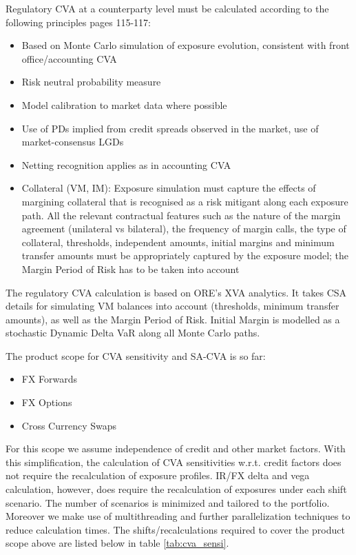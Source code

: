 \medskip\noindent
Regulatory CVA at a counterparty level must be calculated according to the following principles \cite{d424} pages 115-117:
\begin{itemize}
\item Based on Monte Carlo simulation of exposure evolution, consistent with front office/accounting CVA
\item Risk neutral probability measure 
\item Model calibration to market data where possible
\item Use of PDs implied from credit spreads observed in the market, use of market-consensus LGDs
\item Netting recognition applies as in accounting CVA
\item Collateral (VM, IM): Exposure simulation must capture the effects of margining collateral that is recognised as a risk mitigant along each exposure path. All the relevant contractual features such as the nature of the margin agreement (unilateral vs bilateral), the frequency of margin calls, the type of collateral, thresholds, independent amounts, initial margins and minimum transfer amounts must be appropriately captured by the exposure model; the Margin Period of Risk has to be taken into account
\end{itemize}

The regulatory CVA calculation is based on ORE's XVA analytics. It takes CSA details for simulating VM balances into account (thresholds, minimum transfer amounts), as well as the Margin Period of Risk. Initial Margin is modelled as a stochastic Dynamic Delta VaR along all Monte Carlo paths.

The product scope for CVA sensitivity and SA-CVA is so far:
\begin{itemize}
\item FX Forwards
\item FX Options
\item Cross Currency Swaps
\end{itemize}

For this scope we assume independence of credit and other market factors. With this simplification, the calculation of CVA sensitivities w.r.t. credit factors does not require the recalculation of exposure profiles. IR/FX delta and vega calculation, however, does require the recalculation of exposures under each shift scenario. The number of scenarios is minimized and tailored to the portfolio. Moreover we make use of multithreading and further parallelization techniques to reduce calculation times. The shifts/recalculations required to cover the product scope above are listed below in table \ref{tab:cva_sensi}.

